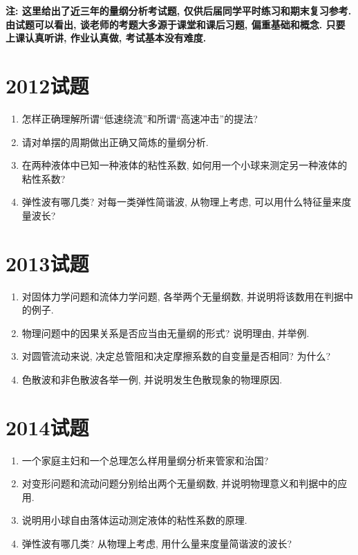 \appendix
\appendixpage

\noindent\textbf{注: 这里给出了近三年的量纲分析考试题, 仅供后届同学平时练习和期末复习参考. 由试题可以看出, 谈老师的考题大多源于课堂和课后习题, 偏重基础和概念. 只要上课认真听讲, 作业认真做, 考试基本没有难度.}

\section{2012试题}
\begin{enumerate}
\item 怎样正确理解所谓``低速绕流''和所谓``高速冲击''的提法?
\item 请对单摆的周期做出正确又简炼的量纲分析.
\item 在两种液体中已知一种液体的粘性系数, 如何用一个小球来测定另一种液体的粘性系数?
\item 弹性波有哪几类? 对每一类弹性简谐波, 从物理上考虑, 可以用什么特征量来度量波长?
\end{enumerate}

\section{2013试题}

\begin{enumerate}
\item 对固体力学问题和流体力学问题, 各举两个无量纲数, 并说明将该数用在判据中的例子.
\item 物理问题中的因果关系是否应当由无量纲的形式? 说明理由, 并举例.
\item 对圆管流动来说, 决定总管阻和决定摩擦系数的自变量是否相同? 为什么?
\item 色散波和非色散波各举一例, 并说明发生色散现象的物理原因.
\end{enumerate}

\section{2014试题}
\begin{enumerate}
\item 一个家庭主妇和一个总理怎么样用量纲分析来管家和治国?
\item 对变形问题和流动问题分别给出两个无量纲数, 并说明物理意义和判据中的应用.
\item 说明用小球自由落体运动测定液体的粘性系数的原理.
\item 弹性波有哪几类? 从物理上考虑, 用什么量来度量简谐波的波长?
\end{enumerate}
